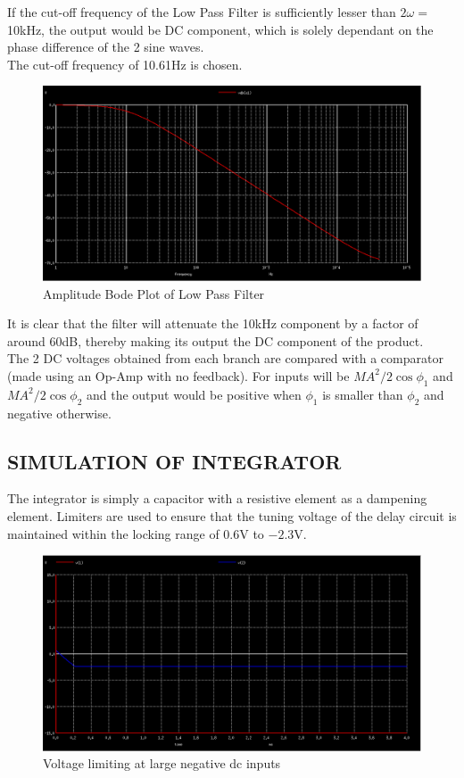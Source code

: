 \documentclass[]{risa}
\begin{document}
If the cut-off frequency of the Low Pass Filter is sufficiently lesser than $2\omega =$10kHz, the output would be DC component, which is solely dependant on the phase difference of the 2 sine waves.\\
The cut-off frequency of 10.61Hz is chosen.
\begin{figure}[bhp]
\includegraphics[width=\columnwidth]{LPF_AmpBodePlot.PNG}
\caption{Amplitude Bode Plot of Low Pass Filter}
\label{LPF_bode}
\end{figure}
It is clear that the filter will attenuate the 10kHz component by a factor of around 60dB, thereby making its output the DC component of the product.\\

The 2 DC voltages obtained from each branch are compared with a comparator (made using an Op-Amp with no feedback). For inputs will be $MA^2/2\cos{\phi_1}$ and $MA^2/2\cos{\phi_2}$ and the output would be positive when $\phi_1$ is smaller than $\phi_2$ and negative otherwise.

\subsection{SIMULATION OF INTEGRATOR}
The integrator is simply a capacitor with a resistive element as a dampening element. Limiters are used to ensure that the tuning voltage of the delay circuit is maintained within the locking range of 0.6V to $-2.3$V. 

\begin{figure}[bhp]
\centering
\includegraphics[width=\columnwidth]{int_Negative.PNG}
\caption{Voltage limiting at large negative dc inputs}
\label{int_neg}
\end{figure}
\end{document}
